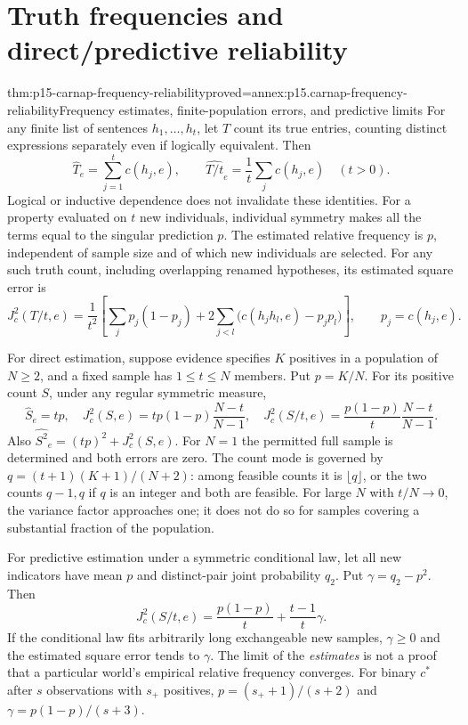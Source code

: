 \section{Truth frequencies and direct/predictive reliability}
\label{sec:p15-carnap-frequency-reliability}

\begin{hbtheorem}{thm:p15-carnap-frequency-reliability}{proved=annex:p15.carnap-frequency-reliability}{Frequency estimates, finite-population errors, and predictive limits}
For any finite list of sentences \(h_1,\ldots,h_t\), let \(T\)
count its true entries, counting distinct expressions separately even
if logically equivalent. Then
\[
 \widehat T_e=\sum_{j=1}^t c(h_j,e),\qquad
 \widehat{T/t}_e=\frac1t\sum_jc(h_j,e)\quad(t>0).
\]
Logical or inductive dependence does not invalidate these identities.
For a property evaluated on \(t\) new individuals, individual
symmetry makes all the terms equal to the singular prediction \(p\).
The estimated relative frequency is \(p\), independent of sample
size and of which new individuals are selected.
For any such truth count, including overlapping renamed hypotheses,
its estimated square error is
\[
 J_c^2(T/t,e)=\frac1{t^2}\left[
 \sum_j p_j(1-p_j)+2\sum_{j<l}
       \bigl(c(h_jh_l,e)-p_jp_l\bigr)\right],
 \qquad p_j=c(h_j,e).
\]

For direct estimation, suppose evidence specifies \(K\) positives
in a population of \(N\geq2\), and a fixed sample has
\(1\leq t\leq N\) members. Put \(p=K/N\). For its positive
count \(S\), under any regular symmetric measure,
\[
 \widehat S_e=tp,\quad
 J_c^2(S,e)=tp(1-p)\frac{N-t}{N-1},\quad
 J_c^2(S/t,e)=\frac{p(1-p)}t\frac{N-t}{N-1}.
\]
Also \(\widehat{S^2}_e=(tp)^2+J_c^2(S,e)\). For \(N=1\)
the permitted full sample is determined and both errors are zero.
The count mode is governed by
\(q=(t+1)(K+1)/(N+2)\): among feasible counts it is
\(\lfloor q\rfloor\), or the two counts \(q-1,q\) if
\(q\) is an integer and both are feasible. For large \(N\)
with \(t/N\to0\), the variance factor approaches one; it does
not do so for samples covering a substantial fraction of the population.

For predictive estimation under a symmetric conditional law, let all
new indicators have mean \(p\) and distinct-pair joint probability
\(q_2\). Put \(\gamma=q_2-p^2\). Then
\[
 J_c^2(S/t,e)=\frac{p(1-p)}t+\frac{t-1}t\gamma.
\]
If the conditional law fits arbitrarily long exchangeable new samples,
\(\gamma\geq0\) and the estimated square error tends to
\(\gamma\). The limit of the \emph{estimates} is not a proof
that a particular world's empirical relative frequency converges.
For binary \(c^*\) after \(s\) observations with \(s_+\)
positives, \(p=(s_++1)/(s+2)\) and
\(\gamma=p(1-p)/(s+3)\).
\end{hbtheorem}

